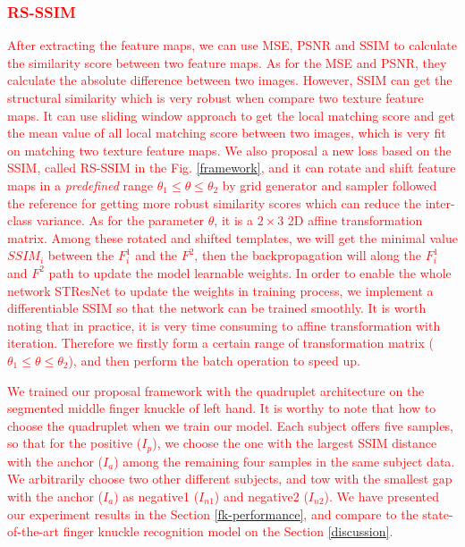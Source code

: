 \textcolor{red}{\subsubsection{RS-SSIM} After extracting the feature maps, we can use MSE, PSNR and SSIM \cite{wang2004image} to calculate the similarity score between two feature maps. As for the MSE and PSNR, they calculate the absolute difference between two images. However, SSIM \cite{wang2004image} can get the structural similarity which is very robust when compare two texture feature maps. It can use sliding window approach to get the local matching score and get the mean value of all local matching score between two images, which is very fit on matching two texture feature maps. We also proposal a new loss based on the SSIM, called RS-SSIM in the Fig. \ref{framework}, and it can rotate and shift feature maps in a \textit{predefined} range $\theta_1 \leq \theta \leq \theta_2$ by grid generator and sampler followed the reference \cite{jaderberg2015spatial} for getting more robust similarity scores which can reduce the inter-class variance. As for the parameter $\theta$, it is a $2 \times 3$ 2D affine transformation matrix. Among these rotated and shifted templates, we will get the minimal value $SSIM_i$ between the $F_i^1$ and the $F^2$, then the backpropagation will along the $F_i^1$ and $F^2$ path to update the model learnable weights. In order to enable the whole network STResNet to update the weights in training process, we implement a differentiable SSIM so that the network can be trained smoothly. It is worth noting that in practice, it is very time consuming to affine transformation with iteration. Therefore we firstly form a certain range of transformation matrix ($\theta_1 \leq \theta \leq \theta_2$), and then perform the batch operation to speed up.}

\textcolor{red}{We trained our proposal framework with the quadruplet architecture \cite{chen2017beyond} on the segmented middle finger knuckle of left hand. It is worthy to note that how to choose the quadruplet when we train our model. Each subject offers five samples, so that for the positive ($I_p$), we choose the one with the largest SSIM distance with the anchor ($I_a$) among the remaining four samples in the same subject data. We arbitrarily choose two other different subjects, and tow with the smallest gap with the anchor ($I_a$) as negative1 ($I_{n1}$) and negative2 ($I_{n2}$). We have presented our experiment results in the Section \ref{fk-performance}, and compare to the state-of-the-art finger knuckle recognition model on the Section \ref{discussion}.}


